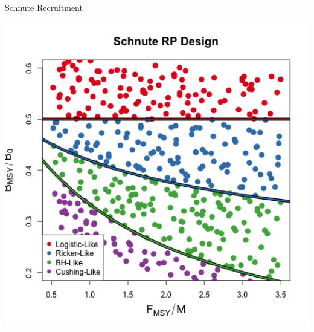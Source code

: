 \documentclass[ xcolor = pdftex, dvipsnames, table ]{beamer}
\begin{document}
\begin{frame}{Schnute Recruitment}
\begin{minipage}[h!]{0.52\textwidth}
        \includegraphics[width=1.1\textwidth]{../../ddBias/designLineColorHHardFlatT30N150WWideN112.png}
\end{minipage}
\end{frame}
\end{document}
